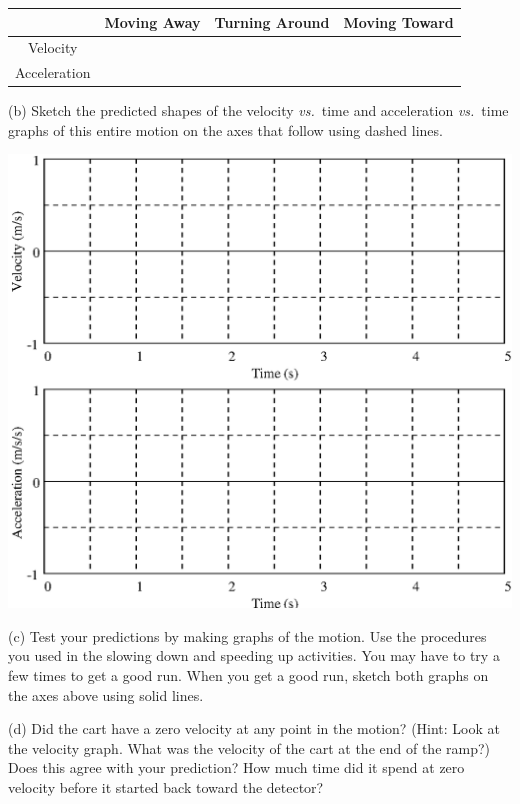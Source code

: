 \vspace{0.3cm}
{\centering \begin{tabular}{|c|c|c|c|}
\hline 
&
Moving Away&
Turning Around&
Moving Toward\\
\hline 
Velocity&
&
&
\\
\hline 
Acceleration&
&
&
\\
\hline 
\end{tabular}\par}
\vspace{0.3cm}

(b) Sketch the predicted shapes of the velocity \textit{vs.}~time and acceleration 
\textit{vs.}~time graphs of this entire motion on the axes that follow using dashed lines.

\vspace{0.3cm}
{\par\centering \includegraphics{slowing/slowing_fig5.eps} \par}

(c) Test your predictions by making graphs of the motion. Use the procedures
you used in the slowing down and speeding up activities. You may have to try
a few times to get a good run. When you get a good run, sketch both graphs on the axes above using solid lines.

\pagebreak[2]
(d) Did the cart have a zero velocity at any point in the motion? (Hint: Look
at the velocity graph. What was the velocity of the cart at the end of the ramp?)
Does this agree with your prediction? How much time did it spend at zero velocity
before it started back toward the detector?
\answerspace{20mm}

